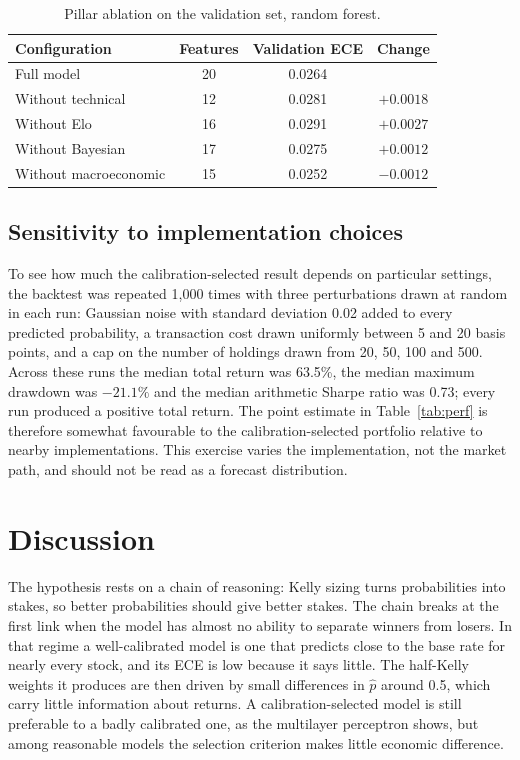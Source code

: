 \documentclass[11pt,a4paper]{article}
\begin{document}
\begin{table}[t]
\centering\small
\caption{Pillar ablation on the validation set, random forest.}
\label{tab:ablation}
\begin{tabular}{@{}lccc@{}}
\toprule
Configuration & Features & Validation ECE & Change \\
\midrule
Full model & 20 & 0.0264 & \\
Without technical & 12 & 0.0281 & $+0.0018$ \\
Without Elo & 16 & 0.0291 & $+0.0027$ \\
Without Bayesian & 17 & 0.0275 & $+0.0012$ \\
Without macroeconomic & 15 & 0.0252 & $-0.0012$ \\
\bottomrule
\end{tabular}
\end{table}

\subsection{Sensitivity to implementation choices}

To see how much the calibration-selected result depends on particular settings, the backtest was repeated 1{,}000 times with three perturbations drawn at random in each run: Gaussian noise with standard deviation 0.02 added to every predicted probability, a transaction cost drawn uniformly between 5 and 20 basis points, and a cap on the number of holdings drawn from 20, 50, 100 and 500. Across these runs the median total return was 63.5\%, the median maximum drawdown was $-21.1\%$ and the median arithmetic Sharpe ratio was 0.73; every run produced a positive total return. The point estimate in Table~\ref{tab:perf} is therefore somewhat favourable to the calibration-selected portfolio relative to nearby implementations. This exercise varies the implementation, not the market path, and should not be read as a forecast distribution.

\section{Discussion}

The hypothesis rests on a chain of reasoning: Kelly sizing turns probabilities into stakes, so better probabilities should give better stakes. The chain breaks at the first link when the model has almost no ability to separate winners from losers. In that regime a well-calibrated model is one that predicts close to the base rate for nearly every stock, and its ECE is low because it says little. The half-Kelly weights it produces are then driven by small differences in $\hat{p}$ around 0.5, which carry little information about returns. A calibration-selected model is still preferable to a badly calibrated one, as the multilayer perceptron shows, but among reasonable models the selection criterion makes little economic difference.
\end{document}
